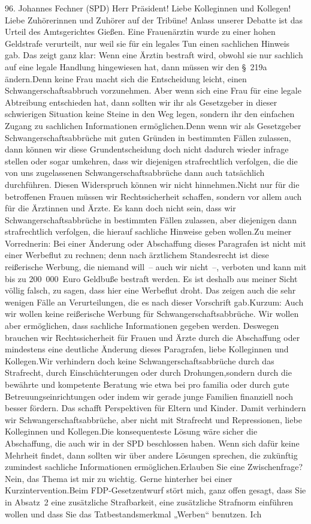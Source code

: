 \documentclass{article}
\begin{document}
	96. Johannes Fechner (SPD) Herr Präsident! Liebe Kolleginnen und Kollegen! Liebe Zuhörerinnen und Zuhörer auf der Tribüne! Anlass unserer Debatte ist das Urteil des Amtsgerichtes Gießen. Eine Frauenärztin wurde zu einer hohen Geldstrafe verurteilt, nur weil sie für ein legales Tun einen sachlichen Hinweis gab. Das zeigt ganz klar: Wenn eine Ärztin bestraft wird, obwohl sie nur sachlich auf eine legale Handlung hingewiesen hat, dann müssen wir den § 219a ändern.Denn keine Frau macht sich die Entscheidung leicht, einen Schwangerschaftsabbruch vorzunehmen. Aber wenn sich eine Frau für eine legale Abtreibung entschieden hat, dann sollten wir ihr als Gesetzgeber in dieser schwierigen Situation keine Steine in den Weg legen, sondern ihr den einfachen Zugang zu sachlichen Informationen ermöglichen.Denn wenn wir als Gesetzgeber Schwangerschaftsabbrüche mit guten Gründen in bestimmten Fällen zulassen, dann können wir diese Grundentscheidung doch nicht dadurch wieder infrage stellen oder sogar umkehren, dass wir diejenigen strafrechtlich verfolgen, die die von uns zugelassenen Schwangerschaftsabbrüche dann auch tatsächlich durchführen. Diesen Widerspruch können wir nicht hinnehmen.Nicht nur für die betroffenen Frauen müssen wir Rechtssicherheit schaffen, sondern vor allem auch für die Ärztinnen und Ärzte. Es kann doch nicht sein, dass wir Schwangerschaftsabbrüche in bestimmten Fällen zulassen, aber diejenigen dann strafrechtlich verfolgen, die hierauf sachliche Hinweise geben wollen.Zu meiner Vorrednerin: Bei einer Änderung oder Abschaffung dieses Paragrafen ist nicht mit einer Werbeflut zu rechnen; denn nach ärztlichem Standesrecht ist diese reißerische Werbung, die niemand will – auch wir nicht –, verboten und kann mit bis zu 200 000 Euro Geldbuße bestraft werden. Es ist deshalb aus meiner Sicht völlig falsch, zu sagen, dass hier eine Werbeflut droht. Das zeigen auch die sehr wenigen Fälle an Verurteilungen, die es nach dieser Vorschrift gab.Kurzum: Auch wir wollen keine reißerische Werbung für Schwangerschaftsabbrüche. Wir wollen aber ermöglichen, dass sachliche Informationen gegeben werden. Deswegen brauchen wir Rechtssicherheit für Frauen und Ärzte durch die Abschaffung oder mindestens eine deutliche Änderung dieses Paragrafen, liebe Kolleginnen und Kollegen.Wir verhindern doch keine Schwangerschaftsabbrüche durch das Strafrecht, durch Einschüchterungen oder durch Drohungen,sondern durch die bewährte und kompetente Beratung wie etwa bei pro familia oder durch gute Betreuungseinrichtungen oder indem wir gerade junge Familien finanziell noch besser fördern. Das schafft Perspektiven für Eltern und Kinder. Damit verhindern wir Schwangerschaftsabbrüche, aber nicht mit Strafrecht und Repressionen, liebe Kolleginnen und Kollegen.Die konsequenteste Lösung wäre sicher die Abschaffung, die auch wir in der SPD beschlossen haben. Wenn sich dafür keine Mehrheit findet, dann sollten wir über andere Lösungen sprechen, die zukünftig zumindest sachliche Informationen ermöglichen.Erlauben Sie eine Zwischenfrage?Nein, das Thema ist mir zu wichtig. Gerne hinterher bei einer Kurzintervention.Beim FDP-Gesetzentwurf stört mich, ganz offen gesagt, dass Sie in Absatz 2 eine zusätzliche Strafbarkeit, eine zusätzliche Strafnorm einführen wollen und dass Sie das Tatbestandsmerkmal „Werben“ benutzen. Ich 
\end{document}
